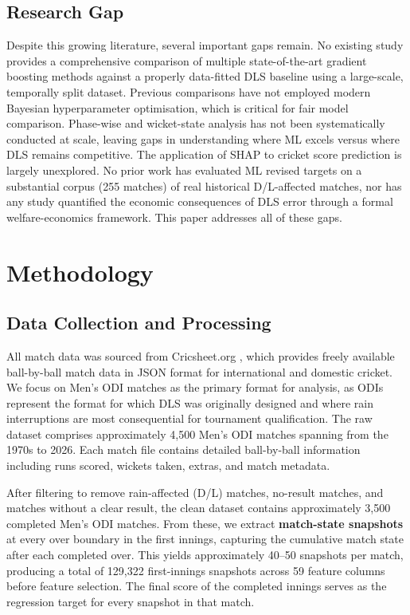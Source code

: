 \documentclass[10pt,a4paper,twocolumn]{article}
\begin{document}
\subsection{Research Gap}

Despite this growing literature, several important gaps remain. No existing study provides a comprehensive comparison of multiple state-of-the-art gradient boosting methods against a properly data-fitted DLS baseline using a large-scale, temporally split dataset. Previous comparisons have not employed modern Bayesian hyperparameter optimisation, which is critical for fair model comparison. Phase-wise and wicket-state analysis has not been systematically conducted at scale, leaving gaps in understanding where ML excels versus where DLS remains competitive. The application of SHAP to cricket score prediction is largely unexplored. No prior work has evaluated ML revised targets on a substantial corpus (255 matches) of real historical D/L-affected matches, nor has any study quantified the economic consequences of DLS error through a formal welfare-economics framework. This paper addresses all of these gaps.

\section{Methodology}
\label{sec:methodology}

\subsection{Data Collection and Processing}

All match data was sourced from Cricsheet.org \citep{cricsheet}, which provides freely available ball-by-ball match data in JSON format for international and domestic cricket. We focus on Men's ODI matches as the primary format for analysis, as ODIs represent the format for which DLS was originally designed and where rain interruptions are most consequential for tournament qualification. The raw dataset comprises approximately 4,500 Men's ODI matches spanning from the 1970s to 2026. Each match file contains detailed ball-by-ball information including runs scored, wickets taken, extras, and match metadata.

After filtering to remove rain-affected (D/L) matches, no-result matches, and matches without a clear result, the clean dataset contains approximately 3,500 completed Men's ODI matches. From these, we extract \textbf{match-state snapshots} at every over boundary in the first innings, capturing the cumulative match state after each completed over. This yields approximately 40--50 snapshots per match, producing a total of 129,322 first-innings snapshots across 59 feature columns before feature selection. The final score of the completed innings serves as the regression target for every snapshot in that match.
\end{document}
